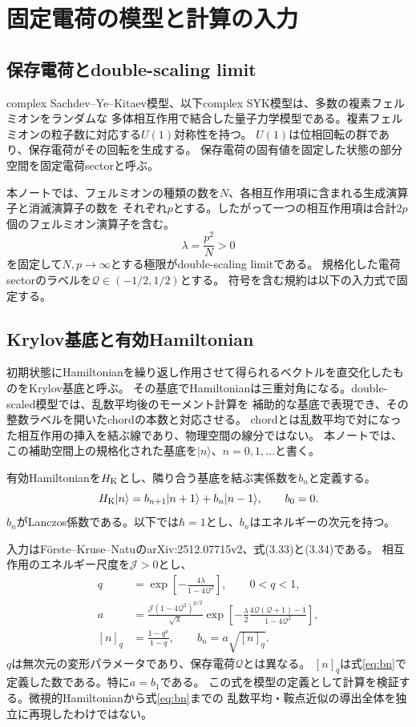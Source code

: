 \documentclass[a4paper,11pt]{ltjsarticle}
\numberwithin{equation}{section}
\newcommand{\ket}[1]{\lvert #1\rangle}
\begin{document}
\section{固定電荷の模型と計算の入力}
\subsection{保存電荷とdouble-scaling limit}
complex Sachdev--Ye--Kitaev模型、以下complex SYK模型は、多数の複素フェルミオンをランダムな
多体相互作用で結合した量子力学模型である。複素フェルミオンの粒子数に対応する$U(1)$対称性を持つ。
$U(1)$は位相回転の群であり、保存電荷がその回転を生成する。
保存電荷の固有値を固定した状態の部分空間を固定電荷sectorと呼ぶ。

本ノートでは、フェルミオンの種類の数を$N$、各相互作用項に含まれる生成演算子と消滅演算子の数を
それぞれ$p$とする。したがって一つの相互作用項は合計$2p$個のフェルミオン演算子を含む。
\begin{equation}
 \lambda=\frac{p^2}{N}>0
 \label{eq:lambda}
\end{equation}
を固定して$N,p\to\infty$とする極限がdouble-scaling limitである。
規格化した電荷sectorのラベルを$\mathcal Q\in(-1/2,1/2)$とする。
符号を含む規約は以下の入力式で固定する。

\subsection{Krylov基底と有効Hamiltonian}
初期状態にHamiltonianを繰り返し作用させて得られるベクトルを直交化したものをKrylov基底と呼ぶ。
その基底でHamiltonianは三重対角になる。double-scaled模型では、乱数平均後のモーメント計算を
補助的な基底で表現でき、その整数ラベルを開いたchordの本数と対応させる。
chordとは乱数平均で対になった相互作用の挿入を結ぶ線であり、物理空間の線分ではない。
本ノートでは、この補助空間上の規格化された基底を$\ket n$、$n=0,1,\ldots$と書く。

有効Hamiltonianを$H_{\rm K}$とし、隣り合う基底を結ぶ実係数を$b_n$と定義する。
\begin{equation}
 H_{\rm K}\ket n=b_{n+1}\ket{n+1}+b_n\ket{n-1},\qquad b_0=0.
 \label{eq:hk}
\end{equation}
$b_n$がLanczos係数である。以下では$\hbar=1$とし、$b_n$はエネルギーの次元を持つ。

入力はF\"orste--Kruse--NatuのarXiv:2512.07715v2、式(3.33)と(3.34)である\cite{Forste}。
相互作用のエネルギー尺度を$\mathcal J>0$とし、
\begin{align}
 q&=\exp\left[-\frac{4\lambda}{1-4\mathcal Q^2}\right],\qquad 0<q<1,
 \label{eq:q}\\
 a&=\frac{\mathcal J(1-4\mathcal Q^2)^{p/2}}{\sqrt\lambda}
 \exp\left[-\frac{\lambda}{2}
 \frac{4\mathcal Q(\mathcal Q+1)-1}{1-4\mathcal Q^2}\right],
 \label{eq:a}\\
 [n]_q&=\frac{1-q^n}{1-q},\qquad b_n=a\sqrt{[n]_q}.
 \label{eq:bn}
\end{align}
$q$は無次元の変形パラメータであり、保存電荷$\mathcal Q$とは異なる。
$[n]_q$は式\eqref{eq:bn}で定義した数である。特に$a=b_1$である。
この式を模型の定義として計算を検証する。微視的Hamiltonianから式\eqref{eq:bn}までの
乱数平均・鞍点近似の導出全体を独立に再現したわけではない。
\end{document}
